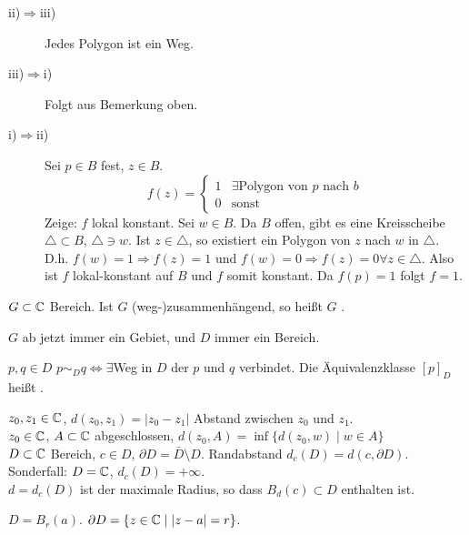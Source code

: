 \begin{beweis}
	\begin{description}
		\item[ii)$ \Rightarrow $iii)] Jedes Polygon ist ein Weg.
		\item[iii)$ \Rightarrow $i)] Folgt aus Bemerkung oben.
		\item[i)$ \Rightarrow $ii)] Sei $ p\in B $ fest, $ z\in B $.
		\[ f(z)=\begin{cases}
		1&  \exists \text{Polygon von }  p  \text{ nach }  b \\0& \text{sonst}
		\end{cases} \]
		Zeige: $ f $ lokal konstant. Sei $ w\in B $. Da $ B $ offen, gibt es eine Kreisscheibe $ \triangle\subset B $, $ \triangle\ni w $. Ist $ z\in\triangle $, so existiert ein Polygon von $ z $ nach $ w $ in $ \triangle $. D.h. $ f(w)=1\Rightarrow f(z)=1 $ und $ f(w)=0\Rightarrow f(z)=0 \forall z\in\triangle$. Also ist $ f $ lokal-konstant auf $ B $ und $ f $ somit konstant. Da $ f(p)=1 $ folgt $ f=1 $.
	\end{description}
\end{beweis}
\newpage
\begin{definition}
	$ G\subset\mathbb{C} $ Bereich. Ist $ G $ (weg-)zusammenh\"angend, so hei\ss t $ G $ .
\end{definition}
$ G $ ab jetzt immer ein Gebiet, und $ D $ immer ein Bereich.\\
\begin{definition}
	$ p,q\in D $ $ p\sim_D q \Leftrightarrow\exists$Weg in $ D $ der $ p $ und $ q $ verbindet. Die \"Aquivalenzklasse $ [p]_D $ hei\ss t .
\end{definition}
$ z_0,z_1\in\mathbb{C} $, $ d(z_0,z_1)=|z_0-z_1| $ Abstand zwischen $ z_0 $ und $ z_1 $.\\
$ z_0\in\mathbb{C} $, $ A\subset\mathbb{C} $ abgeschlossen, $ d(z_0,A)=\inf\lbrace d(z_0,w)\mid w\in A\rbrace $\\
$ D\subset\mathbb{C} $ Bereich, $ c\in D $, $ \partial D=\bar D\setminus D $. Randabstand $ d_c(D)=d(c,\partial D) $.\\
Sonderfall: $ D=\mathbb{C} $, $ d_c(D)=+\infty $.\\
$ d=d_c(D) $ ist der maximale Radius, so dass $ B_d(c)\subset D $ enthalten ist.
\begin{beispiel*}
	$ D=B_r(a) $. $ \partial D=\lbrace z\in\mathbb{C}\mid |z-a|=r\rbrace $.
\end{beispiel*}